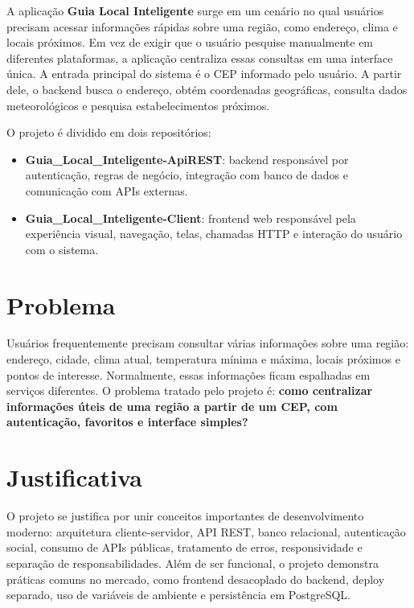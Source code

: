 \documentclass[
    12pt,
    oneside,
    openright,
    a4paper,
    english,
    brazil
]{abntex2}
\begin{document}
A aplicação \textbf{Guia Local Inteligente} surge em um cenário no qual usuários precisam acessar informações rápidas sobre uma região, como endereço, clima e locais próximos. Em vez de exigir que o usuário pesquise manualmente em diferentes plataformas, a aplicação centraliza essas consultas em uma interface única. A entrada principal do sistema é o CEP informado pelo usuário. A partir dele, o backend busca o endereço, obtém coordenadas geográficas, consulta dados meteorológicos e pesquisa estabelecimentos próximos.

O projeto é dividido em dois repositórios:

\begin{itemize}
    \item \textbf{Guia\_Local\_Inteligente-ApiREST}: backend responsável por autenticação, regras de negócio, integração com banco de dados e comunicação com APIs externas.
    \item \textbf{Guia\_Local\_Inteligente-Client}: frontend web responsável pela experiência visual, navegação, telas, chamadas HTTP e interação do usuário com o sistema.
\end{itemize}

\section{Problema}

Usuários frequentemente precisam consultar várias informações sobre uma região: endereço, cidade, clima atual, temperatura mínima e máxima, locais próximos e pontos de interesse. Normalmente, essas informações ficam espalhadas em serviços diferentes. O problema tratado pelo projeto é: \textbf{como centralizar informações úteis de uma região a partir de um CEP, com autenticação, favoritos e interface simples?}

\section{Justificativa}

O projeto se justifica por unir conceitos importantes de desenvolvimento moderno: arquitetura cliente-servidor, API REST, banco relacional, autenticação social, consumo de APIs públicas, tratamento de erros, responsividade e separação de responsabilidades. Além de ser funcional, o projeto demonstra práticas comuns no mercado, como frontend desacoplado do backend, deploy separado, uso de variáveis de ambiente e persistência em PostgreSQL.
\end{document}

